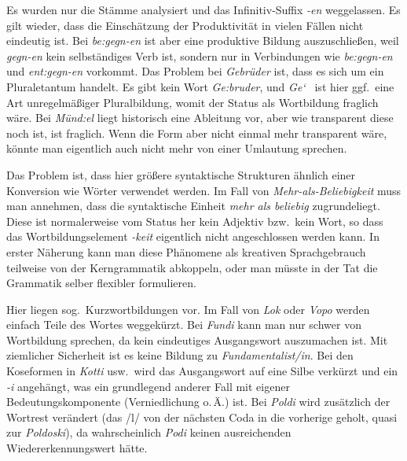 \begin{sloppypar}

Es wurden nur die Stämme analysiert und das Infinitiv-Suffix \textit{-en} weggelassen.
Es gilt wieder, dass die Einschätzung der Produktivität in vielen Fällen nicht eindeutig ist.
Bei \textit{be:gegn-en} ist aber \zB eine produktive Bildung auszuschließen, weil \textit{gegn-en} kein selbständiges Verb ist, sondern nur in Verbindungen wie \textit{be:gegn-en} und \textit{ent:gegn-en} vorkommt.
Das Problem bei \textit{Gebrüder} ist, dass es sich um ein Pluraletantum handelt.
Es gibt kein Wort \textit{\Ast Ge:bruder}, und \textit{Ge\char`~} ist hier ggf.\ eine Art unregelmäßiger Pluralbildung, womit der Status als Wortbildung fraglich wäre.
Bei \textit{Münd:el} liegt historisch eine Ableitung vor, aber wie transparent diese noch ist, ist fraglich.
Wenn die Form aber nicht einmal mehr transparent wäre, könnte man eigentlich auch nicht mehr von einer Umlautung sprechen.

\end{sloppypar}

\label{sol:wortbildung03}

Das Problem ist, dass hier größere syntaktische Strukturen ähnlich einer Konversion wie Wörter verwendet werden.
Im Fall von \textit{Mehr-als-Beliebigkeit} muss man \zB annehmen, dass die syntaktische Einheit \textit{mehr als beliebig} zugrundeliegt.
Diese ist normalerweise vom Status her kein Adjektiv bzw.\ kein Wort, so dass das Wortbildungselement \textit{-keit} eigentlich nicht angeschlossen werden kann.
In erster Näherung kann man diese Phänomene als kreativen Sprachgebrauch teilweise von der Kerngrammatik abkoppeln, oder man müsste in der Tat die Grammatik selber flexibler formulieren.

\label{sol:wortbildung04}

Hier liegen sog.\ Kurzwortbildungen vor.
Im Fall von \textit{Lok} oder \textit{Vopo} werden einfach Teile des Wortes weggekürzt.
Bei \textit{Fundi} kann man nur schwer von Wortbildung sprechen, da kein eindeutiges Ausgangswort auszumachen ist.
Mit ziemlicher Sicherheit ist es keine Bildung zu \textit{Fundamentalist\slash in}.
Bei den Koseformen in \textit{Kotti} usw.\ wird das Ausgangswort auf eine Silbe verkürzt und ein \textit{-i} angehängt, was ein grundlegend anderer Fall mit eigener Bedeutungskomponente (Verniedlichung o.\,Ä.) ist.
Bei \textit{Poldi} wird zusätzlich der Wortrest verändert (das /l/ von der nächsten Coda in die vorherige geholt, quasi zur \textit{Poldoski}), da wahrscheinlich \textit{Podi} keinen ausreichenden Wiedererkennungswert hätte.


